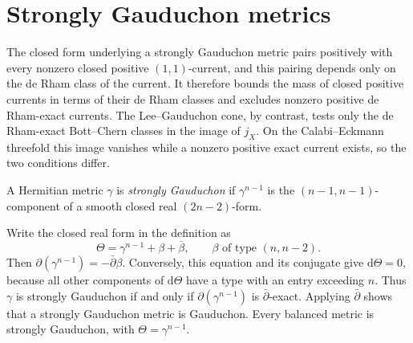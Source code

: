 \section{Strongly Gauduchon metrics}
\label{sec:lee-gauduchon-strong}

The closed form underlying a strongly Gauduchon metric pairs positively with every nonzero closed positive $(1,1)$-current, and this pairing depends only on the de Rham class of the current. It therefore bounds the mass of closed positive currents in terms of their de Rham classes and excludes nonzero positive de Rham-exact currents. The Lee--Gauduchon cone, by contrast, tests only the de Rham-exact Bott--Chern classes in the image of $j_X$. On the Calabi--Eckmann threefold this image vanishes while a nonzero positive exact current exists, so the two conditions differ.

\begin{definition}\label{def:strongly-gauduchon}
A Hermitian metric $\gamma$ is \emph{strongly Gauduchon} if $\gamma^{n-1}$ is the $(n-1,n-1)$-component of a smooth closed real $(2n-2)$-form.
\end{definition}

Write the closed real form in the definition as
\[
 \Theta=\gamma^{n-1}+\beta+\overline\beta,
 \qquad \beta\text{ of type }(n,n-2).
\]
Then $\partial(\gamma^{n-1})=-\bar\partial\beta$. Conversely, this equation and its conjugate give $\mathrm{d}\Theta=0$, because all other components of $\mathrm d\Theta$ have a type with an entry exceeding $n$. Thus $\gamma$ is strongly Gauduchon if and only if $\partial(\gamma^{n-1})$ is $\bar\partial$-exact. Applying $\bar\partial$ shows that a strongly Gauduchon metric is Gauduchon. Every balanced metric is strongly Gauduchon, with $\Theta=\gamma^{n-1}$.

